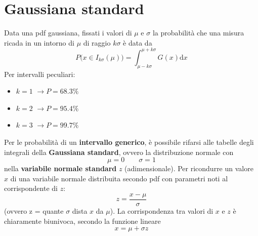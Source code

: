 \documentclass[10pt, oneside]{book}
\newcommand{\rarr}{$\rightarrow$}
\begin{document}
\section{Gaussiana standard}
Data una pdf gaussiana, fissati i valori di $\mu$ e $\sigma$ la probabilità che una misura ricada in un intorno di $\mu$ di raggio $k\sigma$ è data da
\[P\big(x \in I_{k\sigma}(\mu)\big) = \int_{\mu - k\sigma}^{\mu + k \sigma}G(x)\mathrm{d}x\]
Per intervalli peculiari:
\begin{itemize}
\item $k=1$ \rarr $P = 68.3\%$
\item $k=2$ \rarr $P = 95.4\%$
\item $k=3$ \rarr $P = 99.7\%$
\end{itemize}
Per le probabilità di un \textbf{intervallo generico}, è possibile rifarsi alle tabelle degli integrali della \textbf{Gaussiana standard}, ovvero la distribuzione normale con
\[\mu = 0 \qquad \sigma = 1\]
nella \textbf{variabile normale standard} $z$ (adimensionale). Per ricondurre un valore $x$ di una variabile normale distribuita secondo pdf con parametri noti al corrispondente di $z$:
\[z = \frac{x - \mu}{\sigma}\]
(ovvero z = quante $\sigma$ dista $x$ da $\mu$). La corrispondenza tra valori di $x$ e $z$ è chiaramente biunivoca, secondo la funzione lineare
\[x = \mu + \sigma z\]
\end{document}
